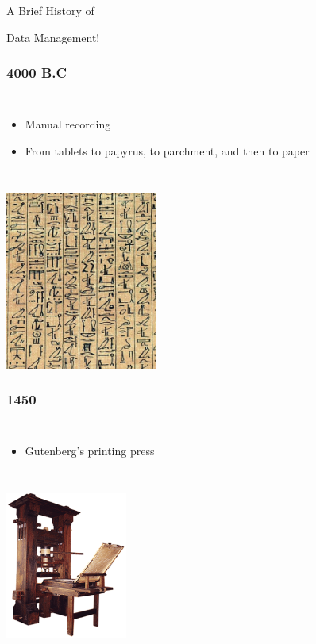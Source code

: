 \documentclass{beamer}
\begin{document}
\begin{frame}
\vspace{1cm}
\Huge{\centerline{A Brief History of}}
\Huge{\centerline{Data Management!}}
\end{frame}

\begin{frame}
\frametitle{4000 B.C}
\begin{columns}[c] 
\column{30em}
\begin{itemize}
  \justifying
  \item Manual recording
  \item From tablets to papyrus, to parchment, and then to paper
\end{itemize}
\end{columns}
\vspace{0.5cm}
\hspace*{3.5cm}\includegraphics[width=5cm]{figs/egyptian.pdf}
\end{frame}

\begin{frame}
\frametitle{1450}
\begin{columns}[c] 
\column{30em}
\begin{itemize}
  \justifying
  \item Gutenberg's printing press
\end{itemize}
\end{columns}
\vspace{0.75cm}
\hspace*{4.5cm}\includegraphics[width=4cm]{figs/gutenberg.pdf}
\end{frame}
\end{document}
